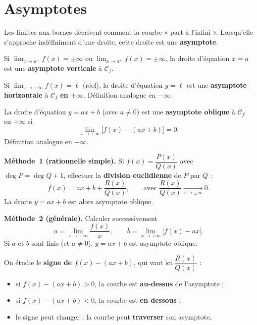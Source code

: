 \section{Asymptotes}

Les limites aux bornes décrivent comment la courbe « part à l'infini ». Lorsqu'elle
s'approche indéfiniment d'une droite, cette droite est une \textbf{asymptote}.

\begin{definition}
Si $\displaystyle\lim_{x\to a^-}f(x)=\pm\infty$ ou $\displaystyle\lim_{x\to a^+}f(x)=\pm\infty$,
la droite d'équation $x=a$ est une \textbf{asymptote verticale} à $\mathcal{C}_f$.
\end{definition}

\begin{definition}
Si $\displaystyle\lim_{x\to+\infty}f(x)=\ell$ (réel), la droite d'équation $y=\ell$ est
une \textbf{asymptote horizontale} à $\mathcal{C}_f$ \textbf{en $+\infty$}. Définition
analogue en $-\infty$.
\end{definition}

\begin{definition}
La droite d'équation $y=ax+b$ (avec $a\neq 0$) est une \textbf{asymptote oblique} à
$\mathcal{C}_f$ en $+\infty$ si
\[ \lim_{x\to+\infty}\big[f(x)-(ax+b)\big]=0. \]
Définition analogue en $-\infty$.
\end{definition}

\begin{aretenir}
\textbf{Méthode~1 (rationnelle simple).} Si $f(x)=\dfrac{P(x)}{Q(x)}$ avec
$\deg P=\deg Q+1$, effectuer la \textbf{division euclidienne} de $P$ par $Q$ :
\[ f(x)=ax+b+\frac{R(x)}{Q(x)},\qquad \text{avec } \frac{R(x)}{Q(x)}\xrightarrow[x\to\pm\infty]{}0. \]
La droite $y=ax+b$ est alors asymptote oblique.

\smallskip
\textbf{Méthode~2 (générale).} Calculer successivement
\[ a=\lim_{x\to+\infty}\frac{f(x)}{x},\qquad b=\lim_{x\to+\infty}\big[f(x)-ax\big]. \]
Si $a$ et $b$ sont finis (et $a\neq 0$), $y=ax+b$ est asymptote oblique.
\end{aretenir}

\begin{propriete}
On étudie le \textbf{signe de $f(x)-(ax+b)$}, qui vaut ici $\dfrac{R(x)}{Q(x)}$ :
\begin{itemize}
  \item si $f(x)-(ax+b)>0$, la courbe est \textbf{au-dessus} de l'asymptote ;
  \item si $f(x)-(ax+b)<0$, la courbe est \textbf{en dessous} ;
  \item le signe peut changer : la courbe peut \textbf{traverser} son asymptote.
\end{itemize}
\end{propriete}

